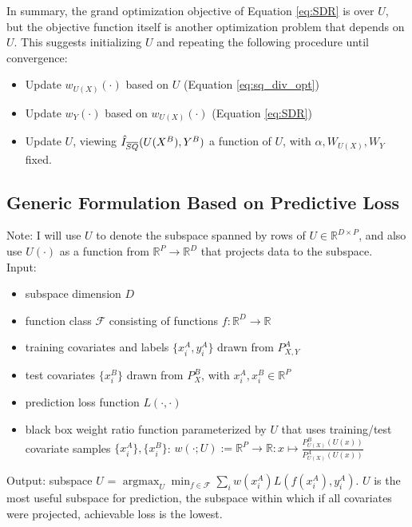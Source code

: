 \documentclass[8pt]{article}
\newcommand{\overbar}[1]{\mkern 1.0mu\overline{\mkern-1.0mu#1\mkern-1.0mu}\mkern 1.0mu}
\begin{document}
In summary, the grand optimization objective of Equation \ref{eq:SDR}
is over $U$, but the objective function itself is another optimization
problem that depends on $U$.  This suggests initializing $U$ and repeating the following
procedure until convergence:
\begin{itemize}
\item Update $w_{U(X)}(\cdot)$ based on $U$ (Equation \ref{eq:sq_div_opt})
\item Update $w_{Y}(\cdot)$ based on $w_{U(X)}(\cdot)$ (Equation
  \ref{eq:SDR})
\item Update $U$, viewing $\hat{I}_{\overbar{SQ}}(U(X^B),Y^B)$ a
  function of $U$, with $\alpha,W_{U(X)},W_Y$ fixed.
\end{itemize}

\pagebreak
\subsection{Generic Formulation Based on Predictive Loss}
Note:  I will use $U$ to denote the subspace spanned by rows of
$U\in\mathbb{R}^{D \times P}$, and also use $U(\cdot)$ as a function
from $\mathbb{R}^P\rightarrow\mathbb{R}^D$ that projects data to the
subspace.\\

\noindent Input: 
\begin{itemize}
\item subspace dimension $D$
\item function class $\mathcal{F}$ consisting
of functions $f:\mathbb{R}^D \rightarrow \mathbb{R}$
\item training
covariates and labels $\{x_i^A,y_i^A\}$ drawn from $P^A_{X,Y}$
\item test
covariates $\{x_i^B\}$ drawn from $P^B_X$,
with $x_i^A,x_i^B\in \mathbb{R}^P$
\item prediction loss function
$L(\cdot,\cdot)$
\item black box weight ratio function parameterized by $U$ that uses
  training/test covariate samples $\{x_i^A\},\{x_i^B\}$:
$w(\cdot;U):=\mathbb{R}^P\rightarrow \mathbb{R}: x\mapsto
\tfrac{P^B_{U(X)}(U(x))}{P^A_{U(X)}(U(x))}$
\end{itemize}
Output: subspace $U$ = $\operatorname{argmax}_{U} \min_{f \in
  \mathcal{F}}\sum_i w(x_i^A)L(f(x_i^A),y_i^A)$.  $U$ is the most
useful subspace for prediction, the subspace within which if all
covariates were projected, achievable loss is the lowest.\\
\end{document}
